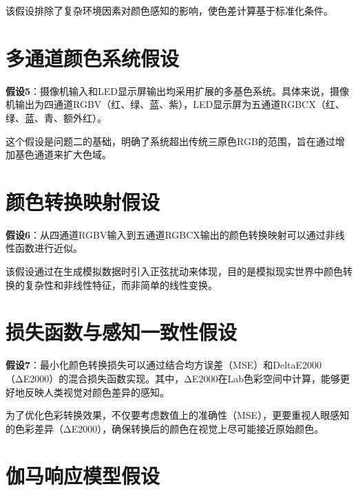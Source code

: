 该假设排除了复杂环境因素对颜色感知的影响，使色差计算基于标准化条件。

\section[\hspace{-2pt}多通道颜色系统假设]{{\heiti{} \hspace{-8pt}多通道颜色系统假设}}\label{section: 多通道颜色系统假设}

\textbf{假设5}：摄像机输入和LED显示屏输出均采用扩展的多基色系统。具体来说，摄像机输出为四通道RGBV（红、绿、蓝、紫），LED显示屏为五通道RGBCX（红、绿、蓝、青、额外红）。

这个假设是问题二的基础，明确了系统超出传统三原色RGB的范围，旨在通过增加基色通道来扩大色域。

\section[\hspace{-2pt}颜色转换映射假设]{{\heiti{} \hspace{-8pt}颜色转换映射假设}}\label{section: 颜色转换映射假设}

\textbf{假设6}：从四通道RGBV输入到五通道RGBCX输出的颜色转换映射可以通过非线性函数进行近似。

该假设通过在生成模拟数据时引入正弦扰动来体现，目的是模拟现实世界中颜色转换的复杂性和非线性特征，而非简单的线性变换。

\section[\hspace{-2pt}损失函数与感知一致性假设]{{\heiti{} \hspace{-8pt}损失函数与感知一致性假设}}\label{section: 损失函数与感知一致性假设}

\textbf{假设7}：最小化颜色转换损失可以通过结合均方误差（MSE）和DeltaE2000（ΔE2000）的混合损失函数实现。其中，ΔE2000在Lab色彩空间中计算，能够更好地反映人类视觉对颜色差异的感知。

为了优化色彩转换效果，不仅要考虑数值上的准确性（MSE），更要重视人眼感知的色彩差异（ΔE2000），确保转换后的颜色在视觉上尽可能接近原始颜色。

\section[\hspace{-2pt}伽马响应模型假设]{{\heiti{} \hspace{-8pt}伽马响应模型假设}}\label{section2: 伽马响应模型假设}

